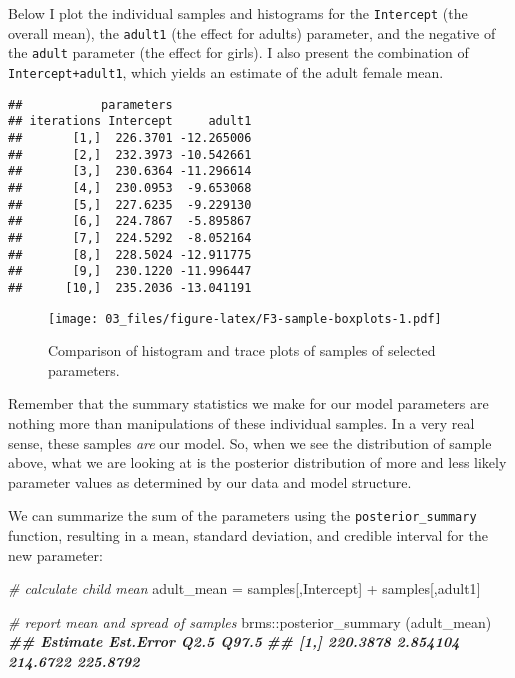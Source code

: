 \documentclass[
]{book}
\newenvironment{Shaded}{\begin{snugshade}}{\end{snugshade}}
\newcommand{\CommentTok}[1]{\textcolor[rgb]{0.56,0.35,0.01}{\textit{#1}}}
\newcommand{\DocumentationTok}[1]{\textcolor[rgb]{0.56,0.35,0.01}{\textbf{\textit{#1}}}}
\newcommand{\FunctionTok}[1]{\textcolor[rgb]{0.00,0.00,0.00}{#1}}
\newcommand{\NormalTok}[1]{#1}
\newcommand{\OtherTok}[1]{\textcolor[rgb]{0.56,0.35,0.01}{#1}}
\newcommand{\SpecialCharTok}[1]{\textcolor[rgb]{0.00,0.00,0.00}{#1}}
\newcommand{\StringTok}[1]{\textcolor[rgb]{0.31,0.60,0.02}{#1}}
\begin{document}
Below I plot the individual samples and histograms for the \texttt{Intercept} (the overall mean), the \texttt{adult1} (the effect for adults) parameter, and the negative of the \texttt{adult} parameter (the effect for girls). I also present the combination of \texttt{Intercept+adult1}, which yields an estimate of the adult female mean.

\begin{verbatim}
##           parameters
## iterations Intercept     adult1
##       [1,]  226.3701 -12.265006
##       [2,]  232.3973 -10.542661
##       [3,]  230.6364 -11.296614
##       [4,]  230.0953  -9.653068
##       [5,]  227.6235  -9.229130
##       [6,]  224.7867  -5.895867
##       [7,]  224.5292  -8.052164
##       [8,]  228.5024 -12.911775
##       [9,]  230.1220 -11.996447
##      [10,]  235.2036 -13.041191
\end{verbatim}

\begin{figure}
\centering
\texttt{[image: 03\_files/figure-latex/F3-sample-boxplots-1.pdf]}
\caption{\label{fig:F3-sample-boxplots}Comparison of histogram and trace plots of samples of selected parameters.}
\end{figure}

Remember that the summary statistics we make for our model parameters are nothing more than manipulations of these individual samples. In a very real sense, these samples \emph{are} our model. So, when we see the distribution of sample above, what we are looking at is the posterior distribution of more and less likely parameter values as determined by our data and model structure.

We can summarize the sum of the parameters using the \texttt{posterior\_summary} function, resulting in a mean, standard deviation, and credible interval for the new parameter:

\begin{Shaded}
\begin{Highlighting}[]
\CommentTok{\# calculate child mean}
\NormalTok{adult\_mean }\OtherTok{=}\NormalTok{ samples[,}\StringTok{\textquotesingle{}Intercept\textquotesingle{}}\NormalTok{] }\SpecialCharTok{+}\NormalTok{ samples[,}\StringTok{\textquotesingle{}adult1\textquotesingle{}}\NormalTok{]}

\CommentTok{\# report mean and spread of samples}
\NormalTok{brms}\SpecialCharTok{::}\FunctionTok{posterior\_summary}\NormalTok{ (adult\_mean)}
\DocumentationTok{\#\#      Estimate Est.Error     Q2.5    Q97.5}
\DocumentationTok{\#\# [1,] 220.3878  2.854104 214.6722 225.8792}
\end{Highlighting}
\end{Shaded}
\end{document}
